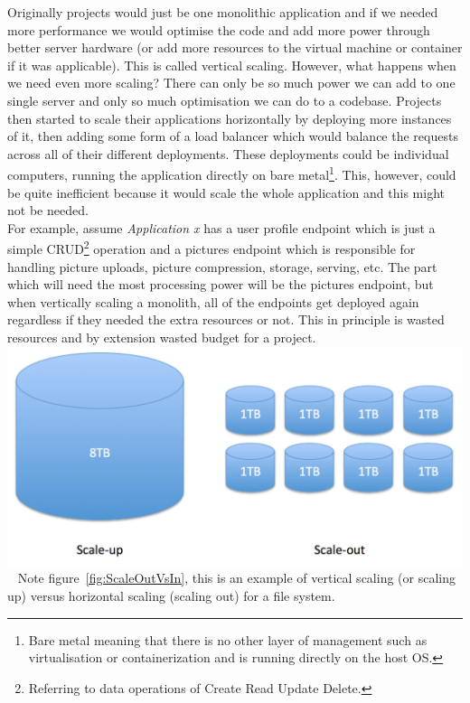 \documentclass{article}
\begin{document}
\begin{multicols}{2}
Originally projects would just be one monolithic application and if we needed more performance we would optimise the code and add more power through better server hardware (or add more resources to the virtual machine or container if it was applicable). This is called vertical scaling. However, what happens when we need even more scaling? There can only be so much power we can add to one single server and only so much optimisation we can do to a codebase. Projects then started to scale their applications horizontally by deploying more instances of it, then adding some form of a load balancer which would balance the requests across all of their different deployments. These deployments could be individual computers, running the application directly on bare metal\footnote{Bare metal meaning that there is no other layer of management such as virtualisation or containerization and is running directly on the host OS.}. This, however, could be quite inefficient because it would scale the whole application and this might not be needed.\\
For example, assume \textit{Application x} has a user profile endpoint which is just a simple CRUD\footnote{Referring to data operations of Create Read Update Delete.} operation and a pictures endpoint which is responsible for handling picture uploads, picture compression, storage, serving, etc. The part which will need the most processing power will be the pictures endpoint, but when vertically scaling a monolith, all of the endpoints get deployed again regardless if they needed the extra resources or not. This in principle is wasted resources and by extension wasted budget for a project.\\

\begingroup
\centering
\includegraphics[width=0.9\linewidth]{./miscAssets/ScaleUpVsScaleOut.png}
~\label{fig:ScaleOutVsIn}
\endgroup
Note figure~\ref{fig:ScaleOutVsIn}, this is an example of vertical scaling (or scaling up) versus horizontal scaling (scaling out) for a file system. \\


\end{multicols}
\end{document}
